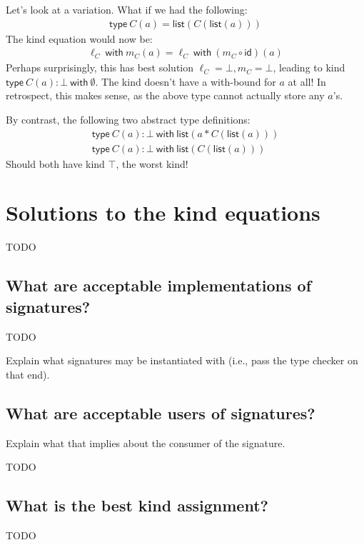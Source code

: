 \documentclass{article}
\newcommand{\type}{\mathsf{type\ }}
\newcommand{\with}{\mathsf{\ with\ }}
\newcommand{\id}{\mathsf{id}}
\begin{document}
Let's look at a variation. What if we had the following:
\begin{align*}
    \mathsf{type\ } C(a) = \mathsf{list}(C(\mathsf{list}(a)))
\end{align*}
The kind equation would now be:
\begin{align*}
    \ell_C \with m_C(a) = \ell_C \with (m_C \circ \id)(a)
\end{align*}
Perhaps surprisingly, this has best solution $\ell_C = \bot, m_C = \bot$, leading to kind $\type C(a) : \bot \with \emptyset$.
The kind doesn't have a with-bound for $a$ at all! In retrospect, this makes sense, as the above type cannot actually store any $a$'s.

By contrast, the following two abstract type definitions:
\begin{align*}
    \mathsf{type\ } C(a) : \bot \with \mathsf{list}(a \ast C(\mathsf{list}(a)))\\
    \mathsf{type\ } C(a) : \bot \with \mathsf{list}(C(\mathsf{list}(a)))
\end{align*}
Should both have kind $\top$, the worst kind!

\section{Solutions to the kind equations}

TODO

\subsection{What are acceptable implementations of signatures?}

TODO

Explain what signatures may be instantiated with (i.e., pass the type checker on that end).

\subsection{What are acceptable users of signatures?}

Explain what that implies about the consumer of the signature.

TODO

\subsection{What is the best kind assignment?}

TODO
\end{document}

